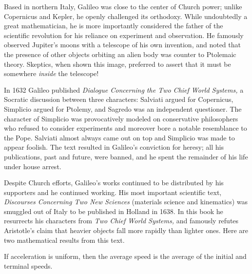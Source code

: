 
Based in northern Italy, Galileo was close to the center of Church power; unlike Copernicus and Kepler, he openly challenged its orthodoxy. While undoubtedly a great mathematician, he is more importantly considered the father of the scientific revolution for his reliance on experiment and observation. He famously observed Jupiter's moons with a telescope of his own invention, and noted that the presence of other objects orbiting an alien body was counter to Ptolemaic theory. Skeptics, when shown this image, preferred to assert that it must be somewhere \emph{inside} the telescope!\smallbreak

In 1632 Galileo published \emph{Dialogue Concerning the Two Chief World Systems,} a Socratic discussion between three characters: Salviati argued for Copernicus, Simplicio argued for Ptolemy, and Sagredo was an independent questioner. The character of Simplicio was provocatively modeled on conservative philosophers who refused to consider experiments and moreover bore a notable resemblance to the Pope. Salviati almost always came out on top and Simplicio was made to appear foolish. The text resulted in Galileo's conviction for heresy; all his publications, past and future, were banned, and he spent the remainder of his life under house arrest.\smallbreak

Despite Church efforts, Galileo's works continued to be distributed by his supporters and he continued working. His most important scientific text, \emph{Discourses Concerning Two New Sciences} (materials science and kinematics) was smuggled out of Italy to be published in Holland in 1638. In this book he resurrects his characters from \emph{Two Chief World Systems,} and famously refutes Aristotle's claim that heavier objects fall more rapidly than lighter ones. %
Here are two mathematical results from this text.\goodbreak

\begin{thm*}{}{}
If acceleration is uniform, then the average speed is the average of the initial and terminal speeds.
\end{thm*}
\label{pg:galileo}

